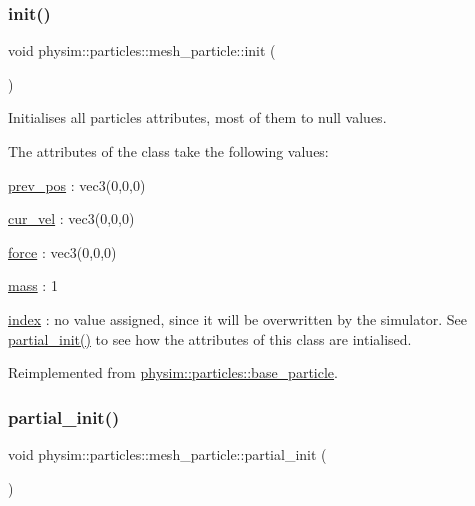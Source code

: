 \subsubsection{\texorpdfstring{init()}{init()}}
{\footnotesize\ttfamily void physim\+::particles\+::mesh\+\_\+particle\+::init (\begin{DoxyParamCaption}{ }\end{DoxyParamCaption})\hspace{0.3cm}{\ttfamily [virtual]}}



Initialises all particle\textquotesingle{}s attributes, most of them to null values. 

The attributes of the class take the following values\+:
\begin{DoxyItemize}
\item \hyperlink{classphysim_1_1particles_1_1base__particle_a08072db6a1a59d21acc9cac6ac8965f7}{prev\+\_\+pos} \+: vec3(0,0,0)
\item \hyperlink{classphysim_1_1particles_1_1base__particle_a66a164d2a130c40901e3ec2709cdad43}{cur\+\_\+vel} \+: vec3(0,0,0)
\item \hyperlink{classphysim_1_1particles_1_1base__particle_adc3b11899d2e50970ae5d4931721a0ef}{force} \+: vec3(0,0,0)
\item \hyperlink{classphysim_1_1particles_1_1base__particle_acb5c9f0b4a911d8981210e2cfc4dda8a}{mass} \+: 1
\item \hyperlink{classphysim_1_1particles_1_1base__particle_a44f5de3bb4b860dfd511e28e1d6519d5}{index} \+: no value assigned, since it will be overwritten by the simulator. See \hyperlink{classphysim_1_1particles_1_1mesh__particle_acf394e0f807a6105e579750afbadeaea}{partial\+\_\+init()} to see how the attributes of this class are intialised. 
\end{DoxyItemize}

Reimplemented from \hyperlink{classphysim_1_1particles_1_1base__particle_a3bba517d51fd0bff7ec583e701765f87}{physim\+::particles\+::base\+\_\+particle}.

\mbox{\label{classphysim_1_1particles_1_1mesh__particle_acf394e0f807a6105e579750afbadeaea}} 
\subsubsection{\texorpdfstring{partial\+\_\+init()}{partial\_init()}}
{\footnotesize\ttfamily void physim\+::particles\+::mesh\+\_\+particle\+::partial\+\_\+init (\begin{DoxyParamCaption}{ }\end{DoxyParamCaption})\hspace{0.3cm}{\ttfamily [private]}}



